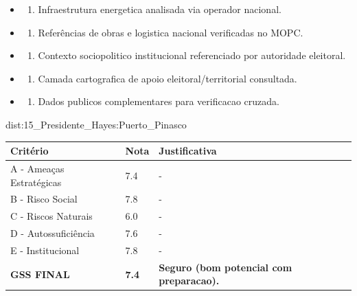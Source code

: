 {\begin{itemize}
\item
  \begin{enumerate}
  \def\labelenumi{\arabic{enumi})}
  \setcounter{enumi}{7}
  \tightlist
  \item
    Infraestrutura energetica analisada via operador nacional.
  \end{enumerate}
\item
  \begin{enumerate}
  \def\labelenumi{\arabic{enumi})}
  \setcounter{enumi}{8}
  \tightlist
  \item
    Referências de obras e logistica nacional verificadas no MOPC.
  \end{enumerate}
\item
  \begin{enumerate}
  \def\labelenumi{\arabic{enumi})}
  \setcounter{enumi}{9}
  \tightlist
  \item
    Contexto sociopolitico institucional referenciado por autoridade
    eleitoral.
  \end{enumerate}
\item
  \begin{enumerate}
  \def\labelenumi{\arabic{enumi})}
  \setcounter{enumi}{10}
  \tightlist
  \item
    Camada cartografica de apoio eleitoral/\allowbreak territorial consultada.
  \end{enumerate}
\item
  \begin{enumerate}
  \def\labelenumi{\arabic{enumi})}
  \setcounter{enumi}{11}
  \tightlist
  \item
    Dados publicos complementares para verificacao cruzada.
  \end{enumerate}
\end{itemize}}{dist:15_Presidente_Hayes:Puerto_Pinasco}
\begin{table}[ht!]
\small \begin{tabular}{p{3.0cm}p{0.8cm}p{6.0cm}} \toprule
\textbf{Critério} & \textbf{Nota} & \textbf{Justificativa} \\ \midrule
A - Ameaças Estratégicas & 7.4 & - \\
B - Risco Social & 7.8 & - \\
C - Riscos Naturais & 6.0 & - \\
D - Autossuficiência & 7.6 & - \\
E - Institucional & 7.8 & - \\
\midrule \textbf{GSS FINAL} & \textbf{7.4} & \textbf{Seguro (bom potencial com preparacao).} \\ \bottomrule \end{tabular}
\end{table}
